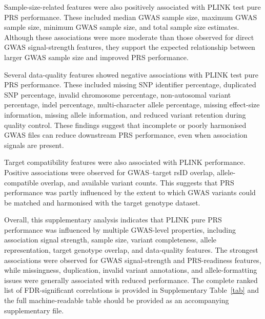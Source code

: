 \documentclass[11pt,a4paper]{article}
\begin{document}
Sample-size-related features were also positively associated with PLINK test pure PRS performance. These included median GWAS sample size, maximum GWAS sample size, minimum GWAS sample size, and total sample size estimates. Although these associations were more moderate than those observed for direct GWAS signal-strength features, they support the expected relationship between larger GWAS sample size and improved PRS performance.

Several data-quality features showed negative associations with PLINK test pure PRS performance. These included missing SNP identifier percentage, duplicated SNP percentage, invalid chromosome percentage, non-autosomal variant percentage, indel percentage, multi-character allele percentage, missing effect-size information, missing allele information, and reduced variant retention during quality control. These findings suggest that incomplete or poorly harmonised GWAS files can reduce downstream PRS performance, even when association signals are present.

Target compatibility features were also associated with PLINK performance. Positive associations were observed for GWAS--target rsID overlap, allele-compatible overlap, and available variant counts. This suggests that PRS performance was partly influenced by the extent to which GWAS variants could be matched and harmonised with the target genotype dataset.

Overall, this supplementary analysis indicates that PLINK pure PRS performance was influenced by multiple GWAS-level properties, including association signal strength, sample size, variant completeness, allele representation, target genotype overlap, and data-quality features. The strongest associations were observed for GWAS signal-strength and PRS-readiness features, while missingness, duplication, invalid variant annotations, and allele-formatting issues were generally associated with reduced performance. The complete ranked list of FDR-significant correlations is provided in Supplementary Table~\ref{tab} and the full machine-readable table should be provided as an accompanying supplementary file.
\end{document}
